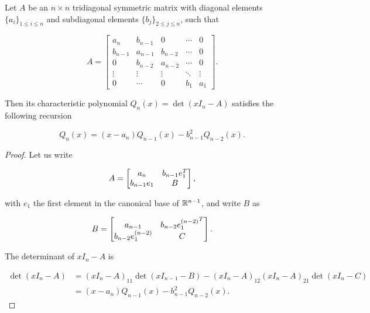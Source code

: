 \begin{lemma} \label{lemma:chpol_tridiag}
    Let $A$ be an $n\times n$ tridiagonal symmetric matrix with diagonal elements $\{a_i\}_{1\le i \le n}$ and subdiagonal elements $\{ b_j \}_{2 \le j \le n}$, such that

    \begin{equation*}
        A = \begin{bmatrix}
            a_n   & b_{n-1} & 0     & \cdots & 0 \\ 
            b_{n-1} & a_{n-1}   & b_{n-2} & \cdots & 0 \\
            0     & b_{n-2} & a_{n-2}  & \cdots & 0 \\
            \vdots & \vdots & \vdots & \ddots & \vdots \\ 
            0      & \cdots & 0      & b_1 & a_1 
        \end{bmatrix}.
    \end{equation*}
    
    
    Then its characteristic polynomial $Q_n(x) = \det(xI_n - A)$ satisfies the following recursion

    \begin{equation*}
        Q_n(x) = (x-a_n)Q_{n-1}(x) - b_{n-1}^2Q_{n-2}(x). \label{eq:recursion}
    \end{equation*}
\end{lemma}

\begin{proof}
    Let us write

    \begin{equation*}
        A = \begin{bmatrix}
            a_n   & b_{n-1} e_1^T \\
            b_{n-1}e_1 & B 
        \end{bmatrix},
    \end{equation*}

    \noindent with $e_1$ the first element in the canonical base of $\mathbb R^{n-1}$, and write $B$ as

    \begin{equation*}
        B = \begin{bmatrix}
            a_{n-1}   & b_{n-2} {e_1^{(n-2)}}^T \\
            b_{n-2} e_1^{(n-2)} & C 
        \end{bmatrix}.
    \end{equation*}

    The determinant of $xI_n - A$ is 

    \begin{align*}
        \det \left( xI_n - A \right) &= (xI_n - A)_{11}\det(xI_{n-1}-B) - (xI_n - A)_{12}(xI_n - A)_{21}\det(xI_n - C)\\ 
        &= (x - a_n)Q_{n-1}(x) - b_{n-1}^2Q_{n-2}(x).
    \end{align*}
\end{proof}

